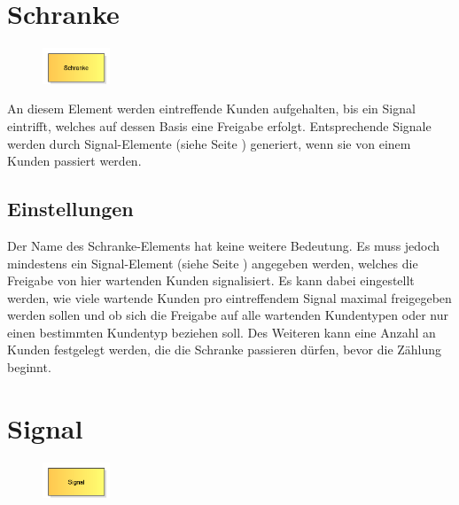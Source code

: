 \section{Schranke}
\label{ref:ModelElementBarrier}

\begin{figure}
\vspace{-22pt}
\includegraphics[width=2cm]{imageModelElementBarrier.png}
\vspace{-22pt}
\end{figure}

An diesem Element werden eintreffende Kunden aufgehalten, bis ein Signal eintrifft, welches auf dessen Basis
eine Freigabe erfolgt. Entsprechende Signale werden durch Signal-Elemente (siehe Seite \pageref{ref:ModelElementSignal}) 
generiert, wenn sie von einem Kunden passiert werden.

\subsection*{Einstellungen}

Der Name des Schranke-Elements hat keine weitere Bedeutung. Es muss jedoch mindestens ein
Signal-Element (siehe Seite \pageref{ref:ModelElementSignal}) angegeben werden, welches die Freigabe
von hier wartenden Kunden signalisiert. Es kann dabei eingestellt werden,
wie viele wartende Kunden pro eintreffendem Signal maximal freigegeben werden sollen und ob sich
die Freigabe auf alle wartenden Kundentypen oder nur einen bestimmten Kundentyp beziehen soll.
Des Weiteren kann eine Anzahl an Kunden festgelegt werden, die die Schranke passieren dürfen,
bevor die Zählung beginnt.


\section{Signal}
\label{ref:ModelElementSignal}

\begin{figure}
\vspace{-22pt}
\includegraphics[width=2cm]{imageModelElementSignal.png}
\vspace{-22pt}
\end{figure}

